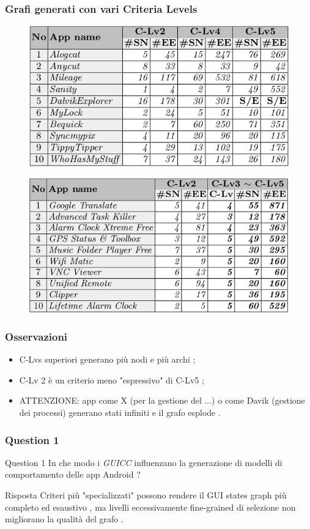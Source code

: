 \documentclass[12pt]{beamer}
\begin{document}
\begin{frame}
\frametitle{Grafi generati con vari Criteria Levels}

\begin{figure}
\includegraphics[width=0.55\linewidth]{images/GraphWidthForOpenSource.png}
\end{figure}
\begin{figure}
\includegraphics[width=0.55\linewidth]{images/GraphWidthForGstore.png}
\end{figure}
\end{frame}


\begin{frame}
\frametitle{Osservazioni}

\begin{itemize}
\item C-Lvs superiori generano pi\`u nodi e pi\`u archi ;

\item C-Lv 2 \`e un criterio meno "espressivo" di C-Lv5 ;

\item ATTENZIONE: app come X (per la gestione del ...) o come Davik (gestione dei processi) generano stati infiniti e il grafo esplode .

\end{itemize}

\end{frame}


\begin{frame}
\frametitle{Question 1}

\begin{block}{Question 1}
In che modo i \emph{GUICC} influenzano la generazione di modelli di comportamento delle app Android ?
\end{block} 
\begin{block}{Risposta}
Criteri pi\`u "specializzati" possono rendere il GUI states graph pi\`u completo ed esaustivo , ma livelli eccessivamente fine-grained di selezione non  migliorano la qualit\`a del grafo .
\end{block}

\end{frame}
\end{document}
